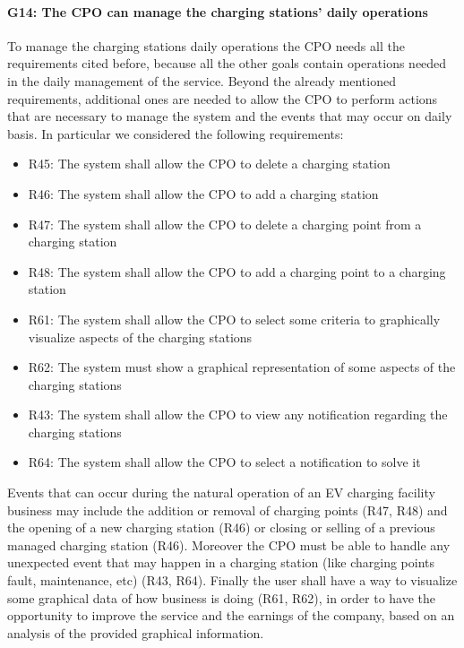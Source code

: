 \paragraph{G14: The CPO can manage the charging stations' daily operations}
To manage the charging stations daily operations the CPO needs all the requirements cited before, because all the other goals contain operations needed in the daily management of the service. Beyond the already mentioned requirements, additional ones are needed to allow the CPO to perform actions that are necessary to manage the system and the events that may occur on daily basis. In particular we considered the following requirements:
\begin{itemize}
     \item R45: The system shall allow the CPO to delete a charging station
     \item R46: The system shall allow the CPO to add a charging station
     \item R47: The system shall allow the CPO to delete a charging point from a charging station
     \item R48: The system shall allow the CPO to add a charging point to a charging station
     \item R61: The system shall allow the CPO to select some criteria to graphically visualize aspects of the charging stations
     \item R62: The system must show a graphical representation of some aspects of the charging stations
     \item R43: The system shall allow the CPO to view any notification regarding the charging stations
     \item R64: The system shall allow the CPO to select a notification to solve it
\end{itemize}
Events that can occur during the natural operation of an EV charging facility business may include the addition or removal of charging points (R47, R48) and the opening of a new charging station (R46) or closing or selling of a previous managed charging station (R46). Moreover the CPO must be able to handle any unexpected event that may happen in a charging station (like charging points fault, maintenance, etc) (R43, R64). Finally the user shall have a way to visualize some graphical data of how business is doing (R61, R62), in order to have the opportunity to improve the service and the earnings of the company, based on an analysis of the provided graphical information.